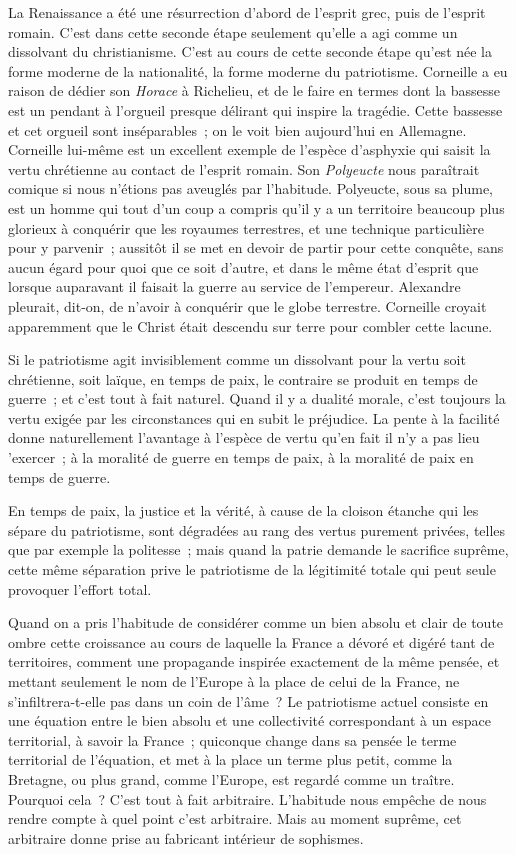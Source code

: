\documentclass[french,twoside]{book} %
\begin{document}
La Renaissance a été une résurrection d'abord de l'esprit grec, puis de l'esprit romain. C'est dans cette seconde étape seulement qu'elle a agi comme un dissolvant du christianisme. C'est au cours de cette seconde étape qu'est née la forme moderne de la nationalité, la forme moderne du patriotisme. Corneille a eu raison de dédier son {\itshape Horace} à Richelieu, et de le faire en termes dont la bassesse est un pendant à l'orgueil presque délirant qui inspire la tragédie. Cette bassesse et cet orgueil sont inséparables ; on le voit bien aujourd'hui en Allemagne. Corneille lui-même est un excellent exemple de l'espèce d'asphyxie qui saisit la vertu chrétienne au contact de l'esprit romain. Son {\itshape Polyeucte} nous paraîtrait comique si nous n'étions pas aveuglés par l'habitude. Polyeucte, sous sa plume, est un homme qui tout d'un coup a compris qu'il y a un territoire beaucoup plus glorieux à conquérir que les royaumes terrestres, et une technique particulière pour y parvenir ; aussitôt il se met en devoir de partir pour cette conquête, sans aucun égard pour quoi que ce soit d'autre, et dans le même état d'esprit que lorsque auparavant il faisait la guerre au service de l'empereur. Alexandre pleurait, dit-on, de n'avoir à conquérir que le globe terrestre. Corneille croyait apparemment que le Christ était descendu sur terre pour combler cette lacune.\par
Si le patriotisme agit invisiblement comme un dissolvant pour la vertu soit chrétienne, soit laïque, en temps de paix, le contraire se produit en temps de guerre ; et c'est tout à fait naturel. Quand il y a dualité morale, c'est toujours la vertu exigée par les circonstances qui en subit le préjudice. La pente à la facilité donne naturellement l'avantage à l'espèce de vertu qu'en fait il n'y a pas lieu 'exercer ; à la moralité de guerre en temps de paix, à la moralité de paix en temps de guerre.\par
En temps de paix, la justice et la vérité, à cause de la cloison étanche qui les sépare du patriotisme, sont dégradées au rang des vertus purement privées, telles que par exemple la politesse ; mais quand la patrie demande le sacrifice suprême, cette même séparation prive le patriotisme de la légitimité totale qui peut seule provoquer l'effort total.\par
Quand on a pris l'habitude de considérer comme un bien absolu et clair de toute ombre cette croissance au cours de laquelle la France a dévoré et digéré tant de territoires, comment une propagande inspirée exactement de la même pensée, et mettant seulement le nom de l'Europe à la place de celui de la France, ne s'infiltrera-t-elle pas dans un coin de l'âme ? Le patriotisme actuel consiste en une équation entre le bien absolu et une collectivité correspondant à un espace territorial, à savoir la France ; quiconque change dans sa pensée le terme territorial de l'équation, et met à la place un terme plus petit, comme la Bretagne, ou plus grand, comme l'Europe, est regardé comme un traître. Pourquoi cela ? C'est tout à fait arbitraire. L'habitude nous empêche de nous rendre compte à quel point c'est arbitraire. Mais au moment suprême, cet arbitraire donne prise au fabricant intérieur de sophismes.\par
\end{document}
